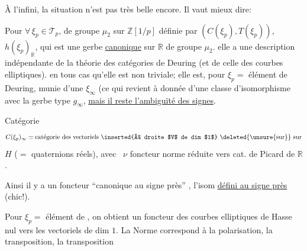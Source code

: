 
À l'infini, la situation n'est pas très belle encore. Il vaut mieux dire:

Pour $\forall\,\xi_p\in\mathcal T_p$,
de groupe $\mu_2$ sur $\mathbb Z[1/p]$ définie par $(C(\xi_p),T(\xi_p))$,
$h(\xi_p)_{\mathbb R}$, qui est une gerbe \uline{canonique} sur $\mathbb R$ de groupe $\mu_2$.
elle a une description indépendante de la théorie des catégories de Deuring (et de celle des courbes elliptiques).
 en tous cas qu'elle est non triviale; elle est, pour $\xi_p=$ élément de Deuring, munie d'une  $\xi_\infty$ (ce qui revient à donnée d'une classe d'isomorphisme  avec la gerbe type $g_\infty$, \uline{mais il reste l'ambiguïté des signes}.

Catégorie
\[
C(\xi_p)_\infty\simeq
\text{catégorie des vectoriels \inserted{à droite $V$ de dim $1$} \deleted{\unsure{sur}} sur}
\]
$H$ ($=$ quaternions réels), avec \ $\nu$ foncteur norme réduite vers cat. de Picard de $\mathbb R$.

Ainsi il y a un foncteur ``canonique au signe près''
 , l'isom \uline{défini au signe près} (chic!).

Pour $\xi_p=$ élément de , on obtient un foncteur  des courbes elliptiques de Hasse nul vers les vectoriels  de dim $1$.
La  Norme correspond à la polarisation, la transposition, la transposition
